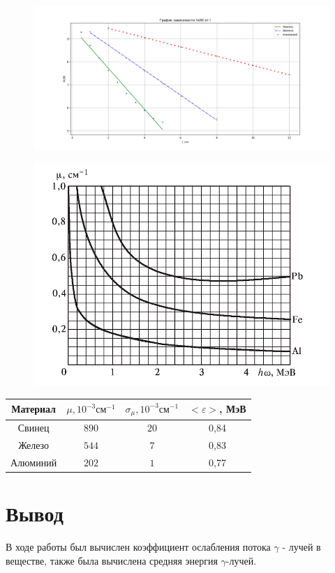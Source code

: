 \documentclass[a4paper,12pt]{article}
\begin{document}
\begin{figure}[H]
\includegraphics[scale=0.5]{graph.png}
\end{figure}

\begin{figure}[H]
\centering
\includegraphics[scale=0.5]{graph1.png}
\end{figure}

\begin{table}[H]
\begin{tabular}{|c|c|c|c|}
\hline
Материал & $\mu, 10^{-3} \text{см}^{-1}$ & $\sigma_\mu,10^{-3} \text{см}^{-1}$ & $<\varepsilon>$, МэВ \\
\hline
Свинец & $890$ & $20$ & 0,84\\
\hline
Железо & $544$ & $7$ & 0,83\\
\hline
Алюминий & $202$ & $1$ & 0,77\\
\hline
\end{tabular}
\end{table}

\section*{Вывод}
В ходе работы был вычислен коэффициент ослабления потока $\gamma$ - лучей в веществе, также была вычислена средняя энергия $\gamma$-лучей.
\end{document}
